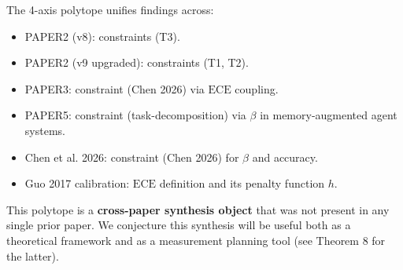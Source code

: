 \begin{remark}
The 4-axis polytope unifies findings across:
\begin{itemize}[nosep]
  \item PAPER2 (v8): constraints (T3).
  \item PAPER2 (v9 upgraded): constraints (T1, T2).
  \item PAPER3: constraint (Chen 2026) via $\mathrm{ECE}$ coupling.
  \item PAPER5: constraint (task-decomposition) via $\beta$ in
        memory-augmented agent systems.
  \item Chen et al. 2026: constraint (Chen 2026) for $\beta$ and accuracy.
  \item Guo 2017 calibration: $\mathrm{ECE}$ definition and its penalty
        function $h$.
\end{itemize}
This polytope is a \textbf{cross-paper synthesis object} that was not
present in any single prior paper. We conjecture this synthesis will be
useful both as a theoretical framework and as a measurement planning tool
(see Theorem 8 for the latter).
\end{remark}


%
%
%
